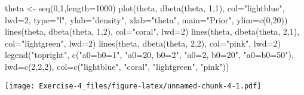 \documentclass[
]{article}
\newenvironment{Shaded}{\begin{snugshade}}{\end{snugshade}}
\newcommand{\AttributeTok}[1]{\textcolor[rgb]{0.77,0.63,0.00}{#1}}
\newcommand{\DecValTok}[1]{\textcolor[rgb]{0.00,0.00,0.81}{#1}}
\newcommand{\FunctionTok}[1]{\textcolor[rgb]{0.00,0.00,0.00}{#1}}
\newcommand{\NormalTok}[1]{#1}
\newcommand{\OtherTok}[1]{\textcolor[rgb]{0.56,0.35,0.01}{#1}}
\newcommand{\StringTok}[1]{\textcolor[rgb]{0.31,0.60,0.02}{#1}}
\begin{document}
\begin{Shaded}
\begin{Highlighting}[]
\NormalTok{theta }\OtherTok{\textless{}{-}} \FunctionTok{seq}\NormalTok{(}\DecValTok{0}\NormalTok{,}\DecValTok{1}\NormalTok{,}\AttributeTok{length=}\DecValTok{1000}\NormalTok{)}
\FunctionTok{plot}\NormalTok{(theta, }\FunctionTok{dbeta}\NormalTok{(theta, }\DecValTok{1}\NormalTok{,}\DecValTok{1}\NormalTok{), }\AttributeTok{col=}\StringTok{"lightblue"}\NormalTok{, }\AttributeTok{lwd=}\DecValTok{2}\NormalTok{,}
\AttributeTok{type=}\StringTok{"l"}\NormalTok{, }\AttributeTok{ylab=}\StringTok{"density"}\NormalTok{, }\AttributeTok{xlab=}\StringTok{"theta"}\NormalTok{, }\AttributeTok{main=}\StringTok{"Prior"}\NormalTok{, }\AttributeTok{ylim=}\FunctionTok{c}\NormalTok{(}\DecValTok{0}\NormalTok{,}\DecValTok{20}\NormalTok{))}
\FunctionTok{lines}\NormalTok{(theta, }\FunctionTok{dbeta}\NormalTok{(theta, }\DecValTok{1}\NormalTok{,}\DecValTok{2}\NormalTok{), }\AttributeTok{col=}\StringTok{"coral"}\NormalTok{, }\AttributeTok{lwd=}\DecValTok{2}\NormalTok{)}
\FunctionTok{lines}\NormalTok{(theta, }\FunctionTok{dbeta}\NormalTok{(theta, }\DecValTok{2}\NormalTok{,}\DecValTok{1}\NormalTok{), }\AttributeTok{col=}\StringTok{"lightgreen"}\NormalTok{, }\AttributeTok{lwd=}\DecValTok{2}\NormalTok{)}
\FunctionTok{lines}\NormalTok{(theta, }\FunctionTok{dbeta}\NormalTok{(theta, }\DecValTok{2}\NormalTok{,}\DecValTok{2}\NormalTok{), }\AttributeTok{col=}\StringTok{"pink"}\NormalTok{, }\AttributeTok{lwd=}\DecValTok{2}\NormalTok{)}
\FunctionTok{legend}\NormalTok{(}\StringTok{"topright"}\NormalTok{, }\FunctionTok{c}\NormalTok{(}\StringTok{"a0=b0=1"}\NormalTok{, }\StringTok{"a0=20, b0=2"}\NormalTok{, }\StringTok{"a0=2, b0=20"}\NormalTok{, }\StringTok{"a0=b0=50"}\NormalTok{),}
\AttributeTok{lwd=}\FunctionTok{c}\NormalTok{(}\DecValTok{2}\NormalTok{,}\DecValTok{2}\NormalTok{,}\DecValTok{2}\NormalTok{), }\AttributeTok{col=}\FunctionTok{c}\NormalTok{(}\StringTok{"lightblue"}\NormalTok{, }\StringTok{"coral"}\NormalTok{, }\StringTok{"lightgreen"}\NormalTok{, }\StringTok{"pink"}\NormalTok{))}
\end{Highlighting}
\end{Shaded}

\texttt{[image: Exercise-4\_files/figure-latex/unnamed-chunk-4-1.pdf]}
\end{document}
